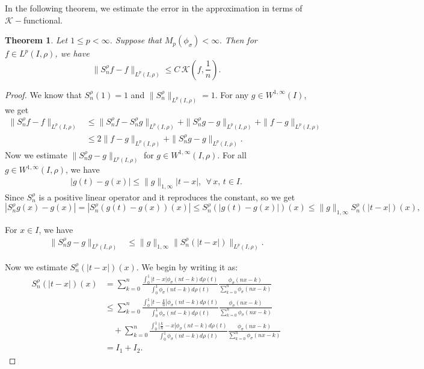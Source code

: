 \documentclass[12pt, reqno]{amsart}
\numberwithin{equation}{section}
\newtheorem{theorem}{Theorem}[section]
\theoremstyle{definition}
\theoremstyle{remark}
\numberwithin{equation}{section}
\newcommand{\Lp}{L^p(I, \rho)}
\begin{document}
In the following theorem, we estimate the error in the approximation in terms of $\mathcal{K}-$functional.
\begin{theorem} \label{errorest}
    Let $1\leq p<\infty$. Suppose that $M_p(\phi_\sigma)<\infty.$ Then for $f\in \Lp$, we have
    $$\|S^{\rho}_nf-f\|_{\Lp}\leq C\,\mathcal{K}\left(f,\frac{1}{n}\right). $$
\end{theorem}
\begin{proof} We know that $S^{\rho}_n(1)=1$ and $\|S^{\rho}_n\|_{\Lp}=1$.
For any $g\in W^{1,\infty}(I)$, we get
\begin{align}
\|S^{\rho}_nf-f\|_{\Lp}
 &\leq \|S^{\rho}_nf-S^{\rho}_ng\|_{\Lp}+\|S^{\rho}_ng-g\|_{\Lp}+\|f-g\|_{\Lp} \nonumber \\
 &\leq 2 \|f-g\|_{\Lp}+\|S^{\rho}_ng-g\|_{\Lp}. \label{Kestimate}
\end{align}
Now we estimate $\|S^{\rho}_ng-g\|_{\Lp}$ for $g\in W^{1,\infty}(I,\rho)$. 
For all $g\in W^{1,\infty}(I,\rho)$, we have 
\begin{align}
|g(t)-g(x)|\leq \|g\|_{1,\infty}|t-x|, \ \ \forall \, x,\,t\in I.\label{gestimate}
\end{align}
Since $S^{\rho}_n$ is a positive linear operator and it reproduces the constant, so we get
 $$|S^{\rho}_ng(x)-g(x)|=|S^{\rho}_n(g(t)-g(x))(x)|\leq S^{\rho}_n(|g(t)-g(x)|)(x)\leq \|g\|_{1,\infty} S^{\rho}_n(|t-x|)(x),$$
 
 For $x \in I$, we have
\begin{align}
    \|S^{\rho}_ng - g\|_{\Lp} &\leq \|g\|_{1,\infty} \|S^{\rho}_n(|t-x|)\|_{\Lp}. \label{gnestimate}
\end{align}

Now we estimate $S^{\rho}_n(|t-x|)(x).$ We begin by writing it as:
\begin{align*}
S^{\rho}_n(|t-x|)(x) &= \sum_{k=0}^n \frac{\int_0^1 |t-x| \phi_\sigma(nt-k) d\rho(t)}{\int_0^1 \phi_\sigma(nt-k) d\rho(t)} \frac{\phi_\sigma(nx-k)}{\sum_{k=0}^n \phi_\sigma(nx-k)} \\
&\leq \sum_{k=0}^n \frac{\int_0^1 |t - \frac{k}{n}| \phi_\sigma(nt-k) d\rho(t)}{\int_0^1 \phi_\sigma(nt-k) d\rho(t)} \frac{\phi_\sigma(nx-k)}{\sum_{k=0}^n \phi_\sigma(nx-k)} \\
&\quad + \sum_{k=0}^n \frac{\int_0^1 \left|\frac{k}{n} - x\right| \phi_\sigma(nt-k) d\rho(t)}{\int_0^1 \phi_\sigma(nt-k) d\rho(t)} \frac{\phi_\sigma(nx-k)}{\sum_{k=0}^n \phi_\sigma(nx-k)} \\
&= I_1 + I_2.
\end{align*}


\end{proof}
\end{document}
